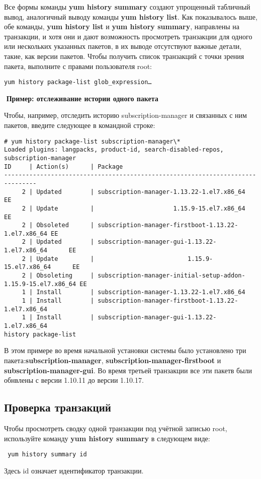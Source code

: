 \documentclass[a4paper,10pt,twoside]{article}
\begin{document}
Все формы команды \textbf{yum history summary} создают упрощенный табличный вывод, аналогичный выводу команды \textbf{yum history list}. Как показывалось выше, обе команды, \textbf{yum history list} и \textbf{yum history summary}, направлены на транзакции, и хотя они и дают возможность просмотреть транзакции для одного или нескольких указанных пакетов, в их выводе отсутствуют важные детали, такие, как версии пакетов. Чтобы получить список транзакций с точки зрения пакета, выполните с правами пользователя root:
\begin{verbatim}
yum history package-list glob_expression…
\end{verbatim} 
⁠
\textbf{Пример: отслеживание истории одного пакета}

Чтобы, например, отследить историю subscription-manager и связанных с ним пакетов, введите следующее в командной строке:
\begin{verbatim}
# yum history package-list subscription-manager\*
Loaded plugins: langpacks, product-id, search-disabled-repos, subscription-manager
ID     | Action(s)      | Package
-------------------------------------------------------------------------------
     2 | Updated        | subscription-manager-1.13.22-1.el7.x86_64          EE
     2 | Update         |                      1.15.9-15.el7.x86_64          EE
     2 | Obsoleted      | subscription-manager-firstboot-1.13.22-1.el7.x86_64 EE
     2 | Updated        | subscription-manager-gui-1.13.22-1.el7.x86_64      EE
     2 | Update         |                          1.15.9-15.el7.x86_64      EE
     2 | Obsoleting     | subscription-manager-initial-setup-addon-1.15.9-15.el7.x86_64 EE
     1 | Install        | subscription-manager-1.13.22-1.el7.x86_64
     1 | Install        | subscription-manager-firstboot-1.13.22-1.el7.x86_64
     1 | Install        | subscription-manager-gui-1.13.22-1.el7.x86_64
history package-list
\end{verbatim} 


В этом примере во время начальной установки системы было установлено три пакета:\textbf{subscription-manager}, \textbf{subscription-manager-firstboot} и \textbf{subscription-manager-gui}. Во время третьей транзакции все эти пакетв были обнвлены с версии 1.10.11 до версии 1.10.17.


\subsection{Проверка транзакций}
Чтобы просмотреть сводку одной транзакции под учётной записью root, используйте команду \textbf{yum history summary} в следующем виде:
\begin{verbatim}
 yum history summary id
\end{verbatim} 
Здесь id означает идентификатор транзакции.
\end{document}
